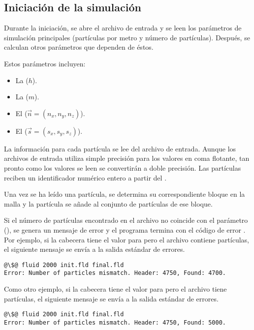 \subsection{Iniciación de la simulación}

Durante la iniciación, se abre el archivo de entrada y se leen los parámetros de
simulación principales (partículas por metro y número de partículas).
Después, se calculan otros parámetros que dependen de éstos.

Estos parámetros incluyen:
\begin{itemize}
\item La  ($h$).
\item La  ($m$).
\item El  ($\vec{n} = (n_x, n_y, n_z)$).
\item El  ($\vec{s} = (s_x, s_y, s_z)$).
\end{itemize}

La información para cada partícula se lee del archivo de entrada. Aunque los
archivos de entrada utiliza simple precisión para los valores en coma flotante,
tan pronto como los valores se leen se convertirán a doble precisión. Las
partículas reciben un identificador numérico entero a partir del .

Una vez se ha leído una partícula, se determina su correspondiente bloque en la
malla y la partícula se añade al conjunto de partículas de ese bloque.

Si el número de partículas encontrado en el archivo no coincide con el parámetro
 (), se genera un mensaje de error y
el programa termina con el código de error
. Por ejemplo, si la cabecera tiene el valor  para
 pero el archivo contiene  partículas, el siguiente mensaje se
envía a la salida estándar de errores.

\begin{lstlisting}[style=terminal,escapechar=@]
@\$@ fluid 2000 init.fld final.fld
Error: Number of particles mismatch. Header: 4750, Found: 4700.
\end{lstlisting}

Como otro ejemplo, si la cabecera tiene el valor  para 
pero el archivo tiene  partículas, el siguiente mensaje se envía a 
la salida estándar de errores.

\begin{lstlisting}[style=terminal,escapechar=@]
@\$@ fluid 2000 init.fld final.fld
Error: Number of particles mismatch. Header: 4750, Found: 5000.
\end{lstlisting}

